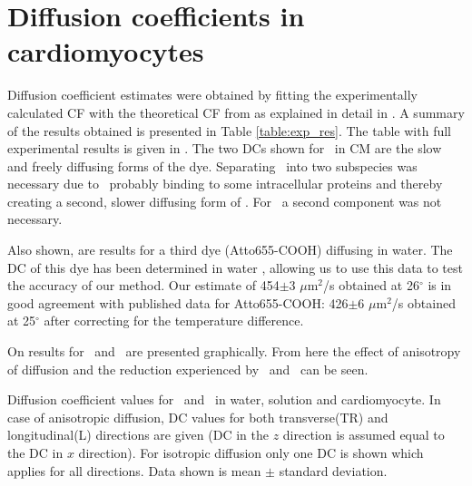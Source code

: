 \section{Diffusion coefficients in cardiomyocytes}
Diffusion coefficient estimates were obtained by fitting the
experimentally calculated \ac{CF} with the theoretical
\ac{CF} from \Eq{~\ref{eq:G_2ctrip}} as explained in detail in \PaperIII.  A summary of the results
obtained is presented in Table \ref{table:exp_res}. The table with full
experimental results is given in \PaperIII. The two \acp{DC} shown for
\ATP\ in \ac{CM} are the slow and freely diffusing forms of the dye.
Separating \ATP\ into two subspecies was necessary due to \ATP\ probably
binding to some intracellular proteins and thereby creating a second,
slower diffusing form of \ATP. For \DEX\ a second component was not necessary.

Also shown, are results for a third dye (Atto655-COOH) diffusing in
water. The \ac{DC} of this dye has been determined in water
\cite{Muller_08_EPL_EurophysicsLetters__83_p46001}, allowing us to use
this data to test the accuracy of our method. Our estimate of 454$\pm$3 $\mu$m$^2$/s obtained
at 26$^\circ$ is in good agreement with published data for Atto655-COOH:
426$\pm$6 $\mu$m$^2$/s obtained at 25$^\circ$
\cite{Muller_08_EPL_EurophysicsLetters__83_p46001} after correcting for
the temperature difference. 

On \F{\ref{fig:d_atto_dex}} results for \ATP\ and \DEX\ are presented
graphically. From here the effect of anisotropy of diffusion and the
reduction experienced by \ATP\ and \DEX\ can be seen. 
\begin{table}
\begin{center}
    \begin{small}

\end{small}
\caption[Experimental \acl{DC} values for \ATP\ and \DEX]{Diffusion coefficient values for \ATP\ and \DEX\ in water,
solution and cardiomyocyte. In case of anisotropic diffusion, \ac{DC}
values for both transverse(TR) and longitudinal(L) directions are
given (\ac{DC} in the $z$ direction is assumed equal to the \ac{DC} in $x$
direction). For isotropic diffusion only one \ac{DC} is shown which applies
for all directions. Data shown is mean $\pm$ standard deviation. }
\label{table:exp_res}
\end{center}
\end{table}

